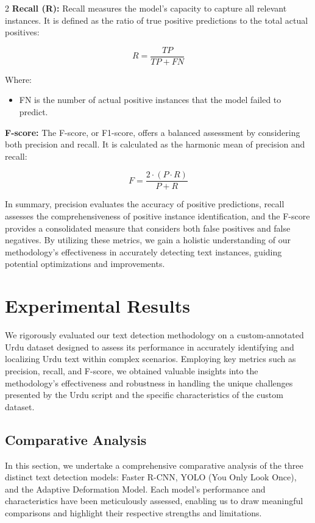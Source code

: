 \documentclass[sn-mathphys,Numbered]{sn-jnl}%
\begin{document}
\begin{multicols}{2}
\textbf{Recall (R):} Recall measures the model's capacity to capture all relevant instances. It is defined as the ratio of true positive predictions to the total actual positives:

\begin{equation}
R = \frac{TP}{TP + FN}
\end{equation}

Where: \\
\begin{itemize}
    \item FN is the number of actual positive instances that the model failed to predict. \\
\end{itemize}

\textbf{F-score:} The F-score, or F1-score, offers a balanced assessment by considering both precision and recall. It is calculated as the harmonic mean of precision and recall:

\begin{equation}
F = \frac{2 \cdot (P \cdot R)}{P + R}
\end{equation}

In summary, precision evaluates the accuracy of positive predictions, recall assesses the comprehensiveness of positive instance identification, and the F-score provides a consolidated measure that considers both false positives and false negatives. By utilizing these metrics, we gain a holistic understanding of our methodology's effectiveness in accurately detecting text instances, guiding potential optimizations and improvements.

\section{Experimental Results}
We rigorously evaluated our text detection methodology on a custom-annotated Urdu dataset designed to assess its performance in accurately identifying and localizing Urdu text within complex scenarios. Employing key metrics such as precision, recall, and F-score, we obtained valuable insights into the methodology's effectiveness and robustness in handling the unique challenges presented by the Urdu script and the specific characteristics of the custom dataset.

\subsection{Comparative Analysis}
\label{Comparative Analysis}
In this section, we undertake a comprehensive comparative analysis of the three distinct text detection models: Faster R-CNN, YOLO (You Only Look Once), and the Adaptive Deformation Model. Each model's performance and characteristics have been meticulously assessed, enabling us to draw meaningful comparisons and highlight their respective strengths and limitations.


\end{multicols}
\end{document}
